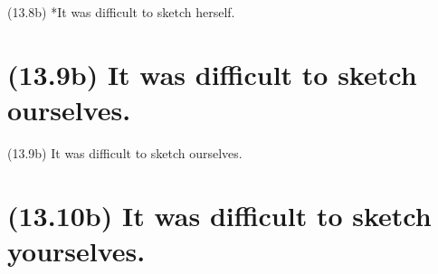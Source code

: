 \documentclass{article}
\begin{document}
\bigbreak
\begin{enumerate*}
\item[(13.8b)] *It was difficult to sketch herself.
\end{enumerate*}
\bigbreak

\bigbreak
\begin{minipage}{\textwidth}
\end{minipage}
\bigbreak

\clearpage

%
%

\section*{(13.9b) It was difficult to sketch ourselves.}

\bigbreak
\begin{enumerate*}
\item[(13.9b)] It was difficult to sketch ourselves.
\end{enumerate*}
\bigbreak

\bigbreak
\begin{minipage}{\textwidth}
\end{minipage}
\bigbreak

\clearpage

%
%

\section*{(13.10b) It was difficult to sketch yourselves.}
\end{document}
